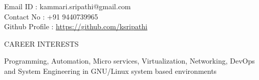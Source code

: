\documentclass{resume} %
\newcommand{\blank}[1]{\hspace*{#1}}
\begin{document}
\blank{5 cm}
{Email ID} \blank{0.7 cm} :
kammari.sripathi@gmail.com \\
\blank{5 cm} 
{Contact No} \blank{0.3 cm} :
+91 9440739965 \\
\blank{5 cm}
{Github Profile : }
\url{https://github.com/ksripathi}
\sectionlineskip \hfill


\begin{rSection}{CAREER INTERESTS}
  
  { Programming, Automation, Micro services, Virtualization,
    Networking, DevOps and System Engineering in GNU/Linux
    system based environments }

\end{rSection}

\end{document}
